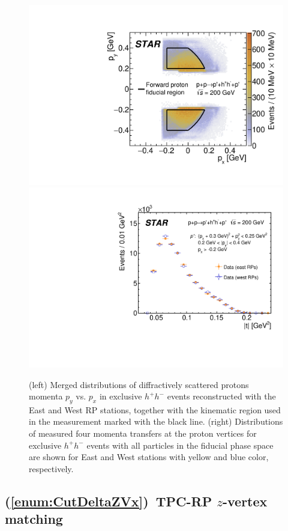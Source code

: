 \begin{figure}[h]
\centering
\includegraphics[width=.465\textwidth]{graphics/eventSelection/RpTracks/PxPyExclusiveAllMerged.pdf}
\includegraphics[width=.523\textwidth]{graphics/eventSelection/RpTracks/Paper_MandelstamT.pdf}
%
\caption{(left) Merged distributions of diffractively scattered protons momenta $p_y$ vs. $p_x$ in exclusive $h^{+}h^{-}$ events reconstructed with the East and West RP stations, together with the kinematic region used in the measurement marked with the black line. (right) Distributions of measured four momenta transfers at the proton vertices for exclusive $h^{+}h^{-}$ events with all particles in the fiducial phase space are shown for East and West stations with yellow and blue color, respectively.}
\label{fig:rp_hits}
\end{figure}





\subsection{(\ref{enum:CutDeltaZVx})~TPC-RP \texorpdfstring{$z$}{z}-vertex matching}\label{sec:C5}


